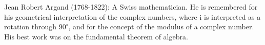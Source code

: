 Jean Robert Argand (1768-1822): A Swiss mathematician.
He is remembered for his 
geometrical interpretation of the complex numbers, where i is 
interpreted as a rotation through $90^\circ$, and for the concept 
of the modulus of a complex number. His best work 
was on the fundamental theorem of algebra.